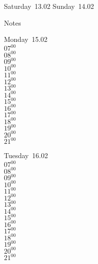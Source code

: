 \documentclass[11pt,a4paper]{book}\usepackage[]{graphicx}\usepackage[]{color}
\begin{document}
\begin{weekendbox}
  Saturday~13.02
  \tcblower
  Sunday~14.02
\end{weekendbox} %
\begin{notebox}
  Notes
\end{notebox}
\clearpage
\begin{headerbox}
\end{headerbox}
\begin{weekdaybox}
  Monday~15.02\\
  { 
  \vfill
  $07^{00}$\\
$08^{00}$\\
$09^{00}$\\
$10^{00}$\\
$11^{00}$\\
$12^{00}$\\
$13^{00}$\\
$14^{00}$\\
$15^{00}$\\
$16^{00}$\\
$17^{00}$\\
$18^{00}$\\
$19^{00}$\\
$20^{00}$\\
$21^{00}$\\
  }
\end{weekdaybox}
\begin{weekdaybox}
  Tuesday~16.02\\
  { 
  \vfill
  $07^{00}$\\
$08^{00}$\\
$09^{00}$\\
$10^{00}$\\
$11^{00}$\\
$12^{00}$\\
$13^{00}$\\
$14^{00}$\\
$15^{00}$\\
$16^{00}$\\
$17^{00}$\\
$18^{00}$\\
$19^{00}$\\
$20^{00}$\\
$21^{00}$\\
  }
\end{weekdaybox}
\end{document}
